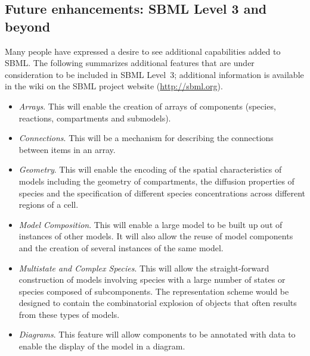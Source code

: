 \subsection{Future enhancements: SBML Level 3 and beyond}
\label{sec:level-3}

Many people have expressed a desire to see additional capabilities
added to SBML.  The following summarizes additional features that
are under consideration to be included in SBML Level~3; additional
information is available in the wiki on the SBML project website
(\url{http://sbml.org}).
\begin{itemize}
  
\item \emph{Arrays}.  This will enable the creation of arrays of
  components (species, reactions, compartments and submodels).
  
\item \emph{Connections}.  This will be a mechanism for describing
  the connections between items in an array.
  
\item \emph{Geometry}.  This will enable the encoding of the
  spatial characteristics of models including the geometry of
  compartments, the diffusion properties of species and the
  specification of different species concentrations across
  different regions of a cell.
  
\item \emph{Model Composition}.  This will enable a large model to
  be built up out of instances of other models.  It will also
  allow the reuse of model components and the creation of several
  instances of the same model.
  
\item \emph{Multistate and Complex Species}.  This will allow the
  straight-forward construction of models involving species with a
  large number of states or species composed of subcomponents.
  The representation scheme would be designed to contain the
  combinatorial explosion of objects that often results from these
  types of models.
  
\item \emph{Diagrams}.  This feature will allow components to be
  annotated with data to enable the display of the model in a
  diagram.
  

\end{itemize}

